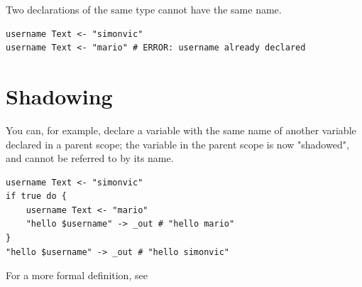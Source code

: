 Two declarations of the same type cannot have the same name.

\begin{verbatim}
username Text <- "simonvic"
username Text <- "mario" # ERROR: username already declared
\end{verbatim}

\section{Shadowing} You can, for example, declare a variable with the same
name of another variable declared in a parent scope; the variable in the parent
scope is now "shadowed", and cannot be referred to by its name.

\begin{verbatim}
username Text <- "simonvic"
if true do {
	username Text <- "mario"
	"hello $username" -> _out # "hello mario"
}
"hello $username" -> _out # "hello simonvic"
\end{verbatim}

For a more formal definition, see~

